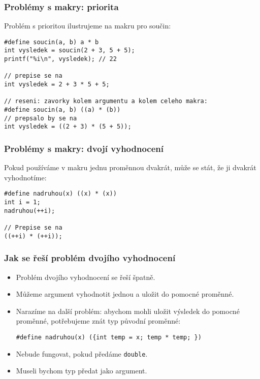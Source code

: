 \documentclass{beamer}
\newenvironment{itemizey}%
  {\large \begin{itemize}%
    \setlength{\itemsep}{6pt}%
    \setlength{\parskip}{6pt}}%
  {\end{itemize}}
\begin{document}
\begin{frame}[t,fragile]\frametitle{Problémy s makry: priorita} 
Problém s prioritou ilustrujeme na makru pro součin:

\begin{verbatim} 
#define soucin(a, b) a * b
int vysledek = soucin(2 + 3, 5 + 5);
printf("%i\n", vysledek); // 22

// prepise se na
int vysledek = 2 + 3 * 5 + 5;

// reseni: zavorky kolem argumentu a kolem celeho makra:
#define soucin(a, b) ((a) * (b))
// prepsalo by se na
int vysledek = ((2 + 3) * (5 + 5));
\end{verbatim}
\end{frame}


\begin{frame}[t,fragile]\frametitle{Problémy s makry: dvojí vyhodnocení}
Pokud používáme v makru jednu proměnnou dvakrát, může se stát, že ji dvakrát vyhodnotíme:

\begin{verbatim} 
#define nadruhou(x) ((x) * (x))
int i = 1;
nadruhou(++i);

// Prepise se na 
((++i) * (++i));
\end{verbatim}
\end{frame}


\begin{frame}[t,fragile]\frametitle{Jak se řeší problém dvojího vyhodnocení} 
    \begin{itemizey}
        \item Problém dvojího vyhodnocení se řeší špatně. 
        \item Můžeme argument vyhodnotit jednou a uložit do pomocné proměnné.
        \item Narazíme na další problém: abychom mohli uložit výsledek do pomocné proměnné, potřebujeme znát typ původní proměnné:
\begin{verbatim} 
#define nadruhou(x) ({int temp = x; temp * temp; })
\end{verbatim}
        \item Nebude fungovat, pokud předáme \texttt{double}.
        \item Museli bychom typ předat jako argument. 
    \end{itemizey}
\end{frame}
\end{document}
